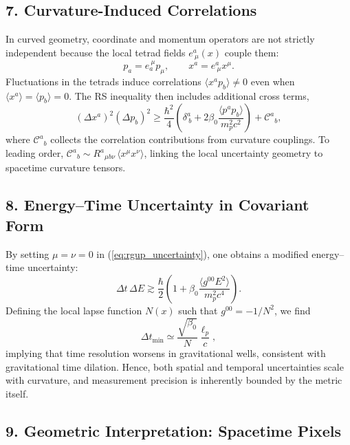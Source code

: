 \documentclass[11pt,oneside]{book}
\numberwithin{equation}{chapter}
\newcommand{\lp}{\ell_p}             %
\newcommand{\mpx}{m_p}               %
\newcommand{\betaz}{\beta_0}
\begin{document}
\subsection*{7. Curvature-Induced Correlations}

In curved geometry, coordinate and momentum operators are not strictly
independent because the local tetrad fields $e^a_{\ \mu}(x)$ couple them:
\begin{equation}
p_a = e_a^{\ \mu}p_\mu,
\qquad
x^a = e^a_{\ \mu}x^\mu.
\end{equation}
Fluctuations in the tetrads induce correlations
$\langle x^a p_b\rangle \neq 0$ even when
$\langle x^a\rangle=\langle p_b\rangle=0$.
The RS inequality then includes additional cross terms,
\begin{equation}
(\Delta x^a)^2(\Delta p_b)^2
\ge
\frac{\hbar^2}{4}
\left(\delta^a_{\ b}
+ 2\betaz \frac{\langle p^a p_b\rangle}{\mpx^2 c^2}\right)
+ \mathcal{C}^a{}_b,
\end{equation}
where $\mathcal{C}^a{}_b$ collects the correlation contributions
from curvature couplings.
To leading order, $\mathcal{C}^a{}_b \sim R^a{}_{\mu b\nu}\,
\langle x^\mu x^\nu\rangle$,
linking the local uncertainty geometry to spacetime curvature tensors.

\subsection*{8. Energy--Time Uncertainty in Covariant Form}

By setting $\mu=\nu=0$ in (\ref{eq:rgup_uncertainty}),
one obtains a modified energy--time uncertainty:
\begin{equation}
\Delta t\,\Delta E
\gtrsim
\frac{\hbar}{2}
\left(
1+\betaz\frac{\langle g^{00}E^2\rangle}{\mpx^2 c^4}
\right).
\end{equation}
Defining the local lapse function $N(x)$ such that
$g^{00}=-1/N^2$, we find
\begin{equation}
\Delta t_{\min}
\simeq
\frac{\sqrt{\betaz}}{N}\frac{\lp}{c},
\end{equation}
implying that time resolution worsens in gravitational wells,
consistent with gravitational time dilation.
Hence, both spatial and temporal uncertainties scale with curvature,
and measurement precision is inherently bounded by the metric itself.

\subsection*{9. Geometric Interpretation: Spacetime Pixels}
\end{document}
